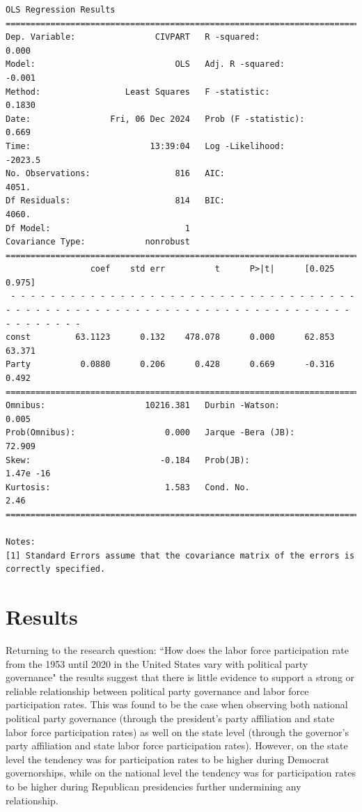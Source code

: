 \begin{verbatim}
OLS Regression Results                            
==============================================================================
Dep. Variable:                CIVPART   R -squared:                       0.000
Model:                            OLS   Adj. R -squared:                 -0.001
Method:                 Least Squares   F -statistic:                    0.1830
Date:                Fri, 06 Dec 2024   Prob (F -statistic):              0.669
Time:                        13:39:04   Log -Likelihood:                -2023.5
No. Observations:                 816   AIC:                             4051.
Df Residuals:                     814   BIC:                             4060.
Df Model:                           1                                         
Covariance Type:            nonrobust                                         
==============================================================================
                 coef    std err          t      P>|t|      [0.025      0.975]
 - - - - - - - - - - - - - - - - - - - - - - - - - - - - - - - - - - - - - - - - - - - - - - - - - - - - - - - - - - - - - - - - - - - - - - - - - - - - - -
const         63.1123      0.132    478.078      0.000      62.853      63.371
Party          0.0880      0.206      0.428      0.669      -0.316       0.492
==============================================================================
Omnibus:                    10216.381   Durbin -Watson:                   0.005
Prob(Omnibus):                  0.000   Jarque -Bera (JB):               72.909
Skew:                          -0.184   Prob(JB):                     1.47e -16
Kurtosis:                       1.583   Cond. No.                         2.46
==============================================================================

Notes:
[1] Standard Errors assume that the covariance matrix of the errors is correctly specified.
\end{verbatim}

\section{Results}

Returning to the research question: ``How does the labor force participation rate from the 1953 until 2020 in the United States vary with political party governance" the results suggest that there is little evidence to support a strong or reliable relationship between political party governance and labor force participation rates. This was found to be the case when observing both national political party governance (through the president's party affiliation and state labor force participation rates) as well on the state level (through the governor's party affiliation and state labor force participation rates). However, on the state level the tendency was for participation rates to be higher during Democrat governorships, while on the national level the tendency was for participation rates to be higher during Republican presidencies further undermining any relationship.

